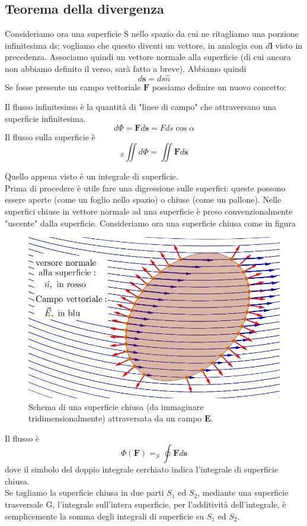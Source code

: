 \documentclass[
10pt, %
a4paper, %
oneside, %
headinclude,footinclude, %
BCOR5mm, %
]{scrartcl}
\begin{document}
\subsection{Teorema della divergenza}\label{ap:thm_divergenza}
Consideriamo ora una superficie S nello spazio da cui ne ritagliamo una porzione infinitesima ds; vogliamo che questo diventi un vettore, in analogia con $d\mathbf{l}$ visto in precedenza. Associamo quindi un vettore normale alla superficie (di cui ancora non abbiamo definito il verso, sarà fatto a breve). Abbiamo quindi
\[d\mathbf{s} = ds \hat{n}\]
Se fosse presente un campo vettoriale $\mathbf{F}$ possiamo definire un nuovo concetto:
\begin{definizione}[Flusso]
	Il flusso infinitesimo è la quantità di "linee di campo" che attraversano una superficie infinitesima. 
	\[d\Phi = \mathbf{F}d\mathbf{s} = Fds\cos\alpha\]
	Il flusso sulla superficie è 
	\[_S\iint d\Phi = \iint \mathbf{F}d\mathbf{s}\]
\end{definizione}
Quello appena visto è un integrale di superficie.\\
Prima di procedere è utile fare una digressione sulle superfici: queste possono essere aperte (come un foglio nello spazio) o chiuse (come un pallone). Nelle superfici chiuse in vettore normale ad una superficie è preso convenzionalmente "uscente" dalla superficie. Consideriamo ora una superficie chiusa come in figura
\begin{figure}[h!]
	\centering
	\includegraphics[width=0.6\linewidth]{../images/flusso2bis}
	\caption{Schema di una superficie chiusa (da immaginare tridimensionalmente) attraversata da un campo \(\mathbf{E}\).}
	\label{fig:flusso2bis}
\end{figure}
\FloatBarrier
Il flusso è 
\[\Phi(\mathbf{F}) = _S\oint \mathbf{F}d\mathbf{s}\]
dove il simbolo del doppio integrale cerchiato indica l'integrale di superficie chiusa.\\
Se tagliamo la superficie chiusa in due parti \(S_1\) ed \(S_2\), mediante una superficie trasversale G, l'integrale sull'intera superficie, per l'additività dell'integrale, è semplicemente la somma degli integrali di superficie su \(S_1\) ed \(S_2\).
\end{document}
